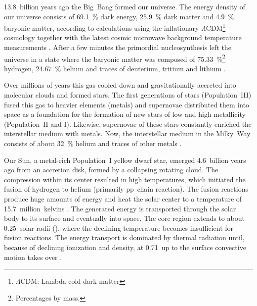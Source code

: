 13.8~billion years ago the Big~Bang formed our universe. The energy density of our universe consists of \SI{69.1}{\percent} dark energy, \SI{25.9}{\percent} dark matter and \SI{4.9}{\percent} baryonic matter, according to calculations using the inflationary $\Lambda$CDM\footnote{$\Lambda$CDM: Lambda cold dark matter} cosmology together with the latest cosmic microwave background temperature measurements \citep{Planck2016}.
After a few minutes the primordial nucleosynthesis left the universe in a state where the baryonic matter was composed of \SI{75.33}{\percent}\footnote{Percentages by mass.} hydrogen, \SI{24.67}{\percent} helium and traces of deuterium, tritium and lithium \citep{Planck2016}.

Over millions of years this gas cooled down and gravitationally accreted into molecular clouds and formed stars. The first generations of stars (Population~III) fused this gas to heavier elements (metals) and supernovae distributed them into space as a foundation for the formation of new stars of low and high metallicity (Population~II and I). Likewise, supernovae of these stars constantly enriched the interstellar medium with metals. Now, the interstellar medium in the Milky~Way consists of about \SI{32}{\percent} helium and traces of other metals \citep{Danziger1970}.

Our Sun, a metal-rich Population~I yellow dwarf star, emerged 4.6~billion years ago \citep{Bahcall1995} from an accretion disk, formed by a collapsing rotating cloud. The compression within its center resulted in high temperatures, which initiated the fusion of hydrogen to helium (primarily pp~chain reaction). The fusion reactions produce huge amounts of energy and heat the solar center to a temperature of 15.7~million~kelvins \citep{Christensen-Dalsgaard1996}. The generated energy is transported through the solar body to its surface and eventually into space.
The core region extends to about 0.25~solar radii (\Rsun), where the declining temperature becomes insufficient for fusion reactions. The energy transport is dominated by thermal radiation until, because of declining ionization and density, at 0.71\,\Rsun{} up to the surface convective motion takes over \citep{Christensen-Dalsgaard1991}. %


